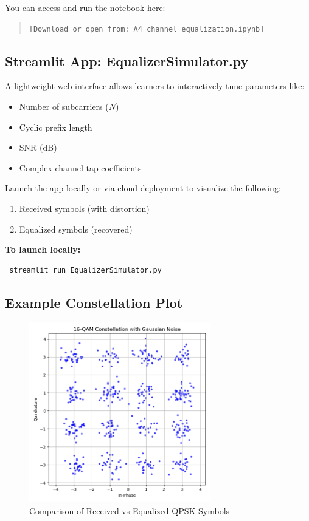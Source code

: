 \noindent
You can access and run the notebook here:

\begin{quote}
\texttt{[Download or open from: A4\_channel\_equalization.ipynb]}
\end{quote}

\subsection{Streamlit App: EqualizerSimulator.py}

A lightweight web interface allows learners to interactively tune parameters like:
\begin{itemize}
  \item Number of subcarriers ($N$)
  \item Cyclic prefix length
  \item SNR (dB)
  \item Complex channel tap coefficients
\end{itemize}

\noindent
Launch the app locally or via cloud deployment to visualize the following:
\begin{enumerate}
  \item Received symbols (with distortion)
  \item Equalized symbols (recovered)
\end{enumerate}

\noindent
\textbf{To launch locally:}
\begin{verbatim}
 streamlit run EqualizerSimulator.py
\end{verbatim}

\subsection{Example Constellation Plot}

\begin{figure}[H]
  \centering
  \includegraphics[width=0.7\textwidth]{./figures/modulation_constellation_example.png}
  \caption{Comparison of Received vs Equalized QPSK Symbols}
  \label{fig:equalized_qpsk}
\end{figure}

